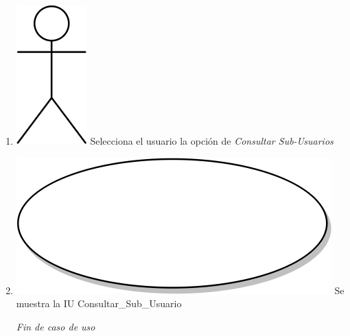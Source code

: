\begin{enumerate}
\item {\includegraphics[scale=.1]{Capitulo3/img/actor.png} Selecciona el usuario la opción de \textit{Consultar Sub-Usuarios}}
\item {\includegraphics[scale=.05]{Capitulo3/img/proceso.png} Se muestra la IU Consultar_Sub_Usuario}

  \textit{Fin de caso de uso} \\  
\end{enumerate}


